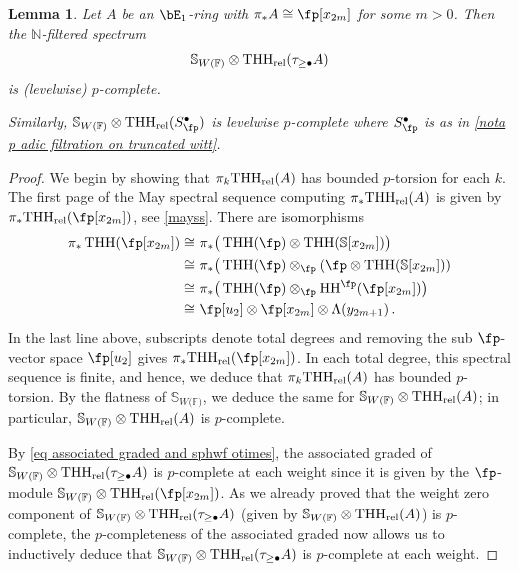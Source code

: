 \documentclass[english,10pt]{amsart}
\newcommand{\sph}{\mathbb{S}}
\newcommand{\sphwf}{\mathbb{S}_{W(\mathbb{F)}}}
\newcommand{\rel}{\textup{rel}}
\newtheorem{lemm}{Lemma}[section]
\theoremstyle{definition}
\numberwithin{equation}{section}
\DeclareMathOperator{\thh}{\ensuremath{\textup{THH}}}
\newcommand{\rthh}{\mathrm{THH}_{\rel}}
\newcommand{\N}{\mathbb{N}}
\newcommand{\wtw}{\tau_{\geq \bullet}}
\newcommand{\pis}{\pi_*}
\begin{document}
\begin{lemm}\label{lemm sphwf otimes thhwtwa is pcomplete}
Let $A$ be an $\bE_1$-ring with $\pis A \cong \fp[x_{2m}]$ for some $m>0$. Then the $\N$-filtered spectrum 
\[\sphwf \otimes \rthh(\wtw A)\]
is (levelwise) $p$-complete. 

Similarly, $\sphwf \otimes \rthh(S_{\fp}^\bullet)$ is levelwise $p$-complete where $S_{\fp}^\bullet$ is as in \autoref{nota  p adic filtration on truncated witt}.
\end{lemm}
\begin{proof}
We begin by showing that  $\pi_k \rthh(A)$ has bounded $p$-torsion for each $k$. The first page of the May spectral sequence computing $\pis \rthh(A)$ is given by  $\pis \rthh(\fp[x_{2m}])$, see \autoref{mayss}. There are isomorphisms 
\begin{equation}\label{eq thh of formal dga}
\begin{split}
\pi_*\thh(\fp[x_{2m}]) \cong \ & \pis\big( \thh(\fp) \otimes \thh(\sph[x_{2m}]) \big)\\
\cong \ & \pis \big(\thh(\fp) \otimes_{\fp} (\fp \otimes \thh(\sph[x_{2m}]))\\
\cong \ & \pis \big(\thh(\fp) \otimes_{\fp} \textup{HH}^{\fp}(\fp[x_{2m}])\big)\\
\cong \ & \fp[u_2] \otimes \fp[x_{2m}] \otimes \Lambda (y_{2m+1})\,.
\end{split}
\end{equation}
In the last line above, subscripts denote total degrees and removing the sub $\fp$-vector space $\fp[u_2]$ gives $ \pis \rthh(\fp[x_{2m}])$. In each total degree, this spectral sequence is finite, and hence, we deduce that $\pi_k\rthh(A)$ has bounded $p$-torsion. By the flatness of $\sphwf$, we deduce the same for $\sphwf \otimes \rthh(A)$; in particular,  $\sphwf \otimes \rthh(A)$ is $p$-complete.


By \eqref{eq associated graded and sphwf otimes}, the associated graded of $\sphwf \otimes \rthh(\wtw A)$ is $p$-complete at each weight since it is given by the $\fp$-module $\sphwf \otimes \rthh(\fp[x_{2m}])$.  As we already proved that the weight zero component of $\sphwf \otimes \rthh(\wtw A)$ (given by $\sphwf \otimes \rthh(A)$) is $p$-complete, the $p$-completeness of the associated graded now allows us to inductively deduce that $\sphwf \otimes \rthh(\wtw A)$ is $p$-complete at each weight. 


\end{proof}
\end{document}
